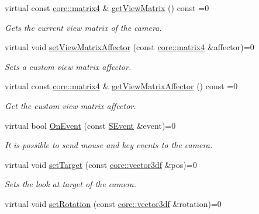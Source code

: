 \begin{DoxyCompactItemize}
virtual const \hyperlink{namespaceirr_1_1core_a4c9d4e29899535971052810954a14431}{core\+::matrix4} \& \hyperlink{classirr_1_1scene_1_1ICameraSceneNode_aef40bb2f8f4a95a66dbb7fc3abee3e49}{get\+View\+Matrix} () const =0
\begin{DoxyCompactList}\small\item\em Gets the current view matrix of the camera. \end{DoxyCompactList}\item 
virtual void \hyperlink{classirr_1_1scene_1_1ICameraSceneNode_adb3500cac2a8a47e6a3f48aa343ce2fd}{set\+View\+Matrix\+Affector} (const \hyperlink{namespaceirr_1_1core_a4c9d4e29899535971052810954a14431}{core\+::matrix4} \&affector)=0
\begin{DoxyCompactList}\small\item\em Sets a custom view matrix affector. \end{DoxyCompactList}\item 
virtual const \hyperlink{namespaceirr_1_1core_a4c9d4e29899535971052810954a14431}{core\+::matrix4} \& \hyperlink{classirr_1_1scene_1_1ICameraSceneNode_a033018cccdb26f94cc33256e23d764c6}{get\+View\+Matrix\+Affector} () const =0
\begin{DoxyCompactList}\small\item\em Get the custom view matrix affector. \end{DoxyCompactList}\item 
virtual bool \hyperlink{classirr_1_1scene_1_1ICameraSceneNode_af27145518f43a17f803cdea086f68f3c}{On\+Event} (const \hyperlink{structirr_1_1SEvent}{S\+Event} \&event)=0
\begin{DoxyCompactList}\small\item\em It is possible to send mouse and key events to the camera. \end{DoxyCompactList}\item 
virtual void \hyperlink{classirr_1_1scene_1_1ICameraSceneNode_a7280b07fd7915c64350db5a132b4ba07}{set\+Target} (const \hyperlink{namespaceirr_1_1core_ae6e2b2a6c552833ebbd5b7463d03586b}{core\+::vector3df} \&pos)=0
\begin{DoxyCompactList}\small\item\em Sets the look at target of the camera. \end{DoxyCompactList}\item 
virtual void \hyperlink{classirr_1_1scene_1_1ICameraSceneNode_af95d5f50c192f212e11f3f050e92a470}{set\+Rotation} (const \hyperlink{namespaceirr_1_1core_ae6e2b2a6c552833ebbd5b7463d03586b}{core\+::vector3df} \&rotation)=0

\end{DoxyCompactItemize}
